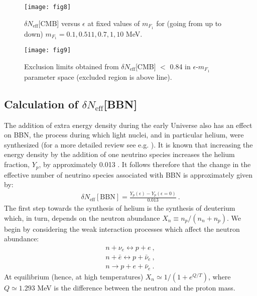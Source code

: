 \documentclass[12pt]{article}
\begin{document}
%
\begin{figure}[htpb]
    \vskip 0.2cm
    \centering
        \texttt{[image: fig8]}
    \caption{$\delta N _{\text{eff}}$[CMB] versus $\epsilon$ at fixed values of $m_{F_1}$ for (going from up to down) $m_{F_1}=0.1, 0.511, 0.7, 1, 10$ MeV.}
    \label{fig:Neffcmb}
\end{figure}
%
\begin{figure}[htpb]
   \vskip 0.2cm
    \centering
        \texttt{[image: fig9]}
    \caption{Exclusion limits obtained from $\delta N _{\text{eff}}$[CMB] $<$ 0.84 in $\epsilon$-$m_{F_1}$ parameter space (excluded region is above line).}
    \label{fig:Exclusion cmb}
\end{figure}
%
\newpage
%
\subsection{Calculation of $\delta N _{\text{eff}}$[BBN]}

The addition of extra energy density during the early Universe also has an effect on BBN, the process during which light nuclei, and in particular helium, were synthesized (for a more detailed review see e.g. \cite{weinberg}). It is known that increasing the energy density by the addition of one neutrino species increases the helium fraction, $Y _p$, by approximately 0.013 \cite{bernstein}. It follows therefore that the change in the effective number of neutrino species associated with BBN is approximately given by:
%
\begin{eqnarray}
\delta N _{\text{eff}}[\text{BBN}] = \frac{Y _p (\epsilon) - Y _p (\epsilon = 0)}{0.013} \ .
\label{Neffbbn}
\end{eqnarray}
%
The first step towards the synthesis of helium is the synthesis of deuterium which, in turn, depends on the neutron abundance $X _n \equiv n _p/(n _n + n _p)$. We begin by considering the weak interaction processes which affect the neutron abundance:
%
\begin{eqnarray}
n + \nu _e \leftrightarrow p + e \ , \nonumber \\
n + \bar e \leftrightarrow p + \bar \nu _e \ , \nonumber \\
n \rightarrow p + e + \bar \nu _e \ .
\end{eqnarray}
%
At equilibrium (hence, at high temperatures) $X _n \simeq 1/(1 + e^{Q/T})$, where $Q \simeq 1.293$ MeV is the difference between the neutron and the proton mass.
\end{document}
